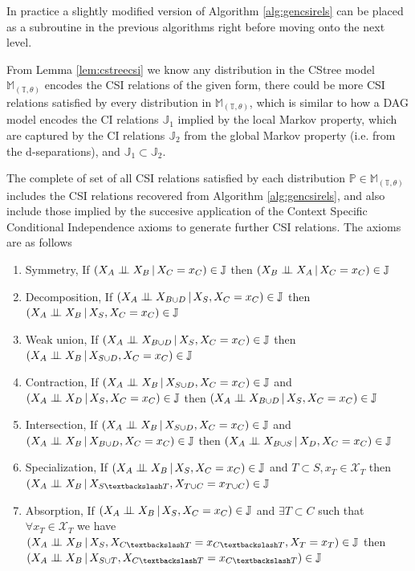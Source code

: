 \documentclass{tufte-book}
\begin{document}
In practice a slightly modified version of Algorithm \ref{alg:gencsirels} can be placed as a subroutine in the previous algorithms right before moving onto the next level.


From Lemma \ref{lem:cstreecsi} we know any distribution in the CStree model \(\mathbb{M}_{(\mathbb{T},\theta)}\) encodes the CSI relations of the given form, there could be more CSI relations satisfied by every distribution in \(\mathbb{M}_{(\mathbb{T},\theta)}\), which is similar to how a DAG model encodes the CI relations \(\mathbb{J}_1\) implied by the local Markov property, which are captured by the CI relations \(\mathbb{J}_2\) from the global Markov property (i.e. from the d-separations), and \(\mathbb{J}_1 \subset \mathbb{J}_2\).


The complete of set of all CSI relations satisfied by each distribution \(\mathbb{P} \in \mathbb{M}_{(\mathbb{T},\theta)}\) includes the CSI relations recovered from Algorithm \ref{alg:gencsirels}, and also include those implied by the succesive application of the Context Specific Conditional Independence axioms to generate further CSI relations. The axioms are as follows


\begin{enumerate}
\item Symmetry, If \((X_A \perp \!\!\! \perp X_B \,|\, X_C=x_C) \in \mathbb{J}\) then \((X_B \perp \!\!\! \perp X_A \,|\, X_C=x_C) \in \mathbb{J}\)
\item Decomposition, If \((X_A \perp \!\!\! \perp X_{B \cup D} \,|\, X_S, X_C=x_C) \in \mathbb{J}\) then \((X_A \perp \!\!\! \perp X_B \,|\, X_S, X_C=x_C) \in \mathbb{J}\)
\item Weak union, If \((X_A \perp \!\!\! \perp X_{B \cup D} \,|\, X_S, X_C=x_C) \in \mathbb{J}\) then \((X_A \perp \!\!\! \perp X_{B} \,|\, X_{S \cup D}, X_C=x_C) \in \mathbb{J}\)
\item Contraction, If \((X_A \perp \!\!\! \perp X_B \,|\, X_{S \cup D}, X_C=x_C) \in \mathbb{J}\) and \((X_A \perp \!\!\! \perp X_D \,|\,X_S, X_C=x_C) \in \mathbb{J}\) then \((X_A \perp \!\!\! \perp X_{B \cup D} \,|\, X_S, X_C=x_C) \in \mathbb{J}\)
\item Intersection,  If \((X_A \perp \!\!\! \perp X_B \,|\, X_{S \cup D}, X_C=x_C) \in \mathbb{J}\) and  \((X_A \perp \!\!\! \perp X_B \,|\, X_{B \cup D}, X_C=x_C) \in \mathbb{J}\) then  \((X_A \perp \!\!\! \perp X_{B \cup S} \,|\, X_D, X_C=x_C) \in \mathbb{J}\)
\item Specialization, If \((X_A \perp \!\!\! \perp X_B \,|\, X_S, X_C=x_C) \in \mathbb{J}\) and \(T \subset S, x_T \in \mathcal{X}_T\) then \((X_A \indep X_B \,|\, X_{S \textbackslash T}, X_{T \cup C} = x_{T \cup C}) \in \mathbb{J}\)
\item Absorption, If \((X_A \perp \!\!\! \perp X_B \,|\, X_S, X_C=x_C) \in \mathbb{J}\) and \(\exists T \subset C\) such that \(\forall x_T \in \mathcal{X}_T\) we have \((X_A \indep X_B \,|\, X_S, X_{C\textbackslash T}=x_{C \textbackslash T}, X_T=x_T) \in \mathbb{J}\) then \((X_A \indep X_B \,|\, X_{S \cup T}, X_{C \textbackslash T}=x_{C \textbackslash T}) \in \mathbb{J}\)
\end{enumerate}
\end{document}
